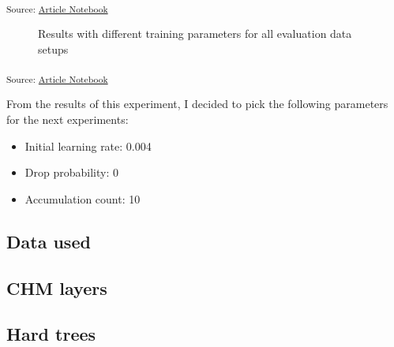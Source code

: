 \documentclass[
  letterpaper,
  DIV=11,
  numbers=noendperiod]{scrartcl}
\providecommand{\tightlist}{%
  \setlength{\itemsep}{0pt}\setlength{\parskip}{0pt}}\usepackage{longtable,booktabs,array}
\begin{document}
\textsubscript{Source:
\href{https://ZokszY.github.io/Geodan-internship-report/index-preview.html}{Article
Notebook}}

\begin{figure}[H]


\caption{\label{fig-training-parameters-data}Results with different
training parameters for all evaluation data setups}

\end{figure}%

\textsubscript{Source:
\href{https://ZokszY.github.io/Geodan-internship-report/index-preview.html}{Article
Notebook}}

From the results of this experiment, I decided to pick the following
parameters for the next experiments:

\begin{itemize}
\tightlist
\item
  Initial learning rate: 0.004
\item
  Drop probability: 0
\item
  Accumulation count: 10
\end{itemize}

\subsection{Data used}\label{data-used}

\subsection{CHM layers}\label{chm-layers}

\subsection{Hard trees}\label{hard-trees}
\end{document}
